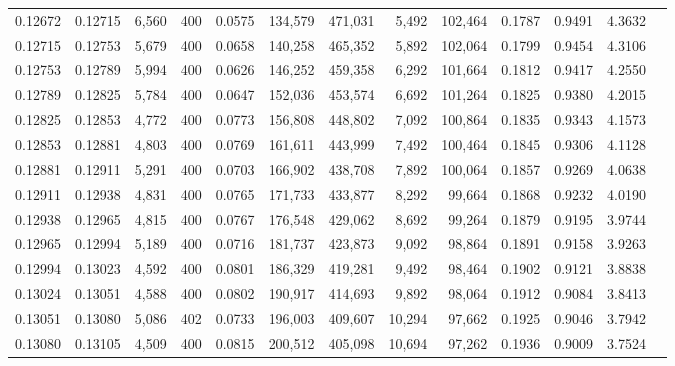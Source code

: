 \begin{tabular}{rrrrrrrrrrrrr}
0.12672 & 0.12715 &  6,560 &   400 &                                     0.0575 & 134,579 & 471,031 &   5,492 & 102,464 & 0.1787 & 0.9491 & 4.3632 \\
0.12715 & 0.12753 &  5,679 &   400 &                                     0.0658 & 140,258 & 465,352 &   5,892 & 102,064 & 0.1799 & 0.9454 & 4.3106 \\
0.12753 & 0.12789 &  5,994 &   400 &                                     0.0626 & 146,252 & 459,358 &   6,292 & 101,664 & 0.1812 & 0.9417 & 4.2550 \\
0.12789 & 0.12825 &  5,784 &   400 &                                     0.0647 & 152,036 & 453,574 &   6,692 & 101,264 & 0.1825 & 0.9380 & 4.2015 \\
0.12825 & 0.12853 &  4,772 &   400 &                                     0.0773 & 156,808 & 448,802 &   7,092 & 100,864 & 0.1835 & 0.9343 & 4.1573 \\
0.12853 & 0.12881 &  4,803 &   400 &                                     0.0769 & 161,611 & 443,999 &   7,492 & 100,464 & 0.1845 & 0.9306 & 4.1128 \\
0.12881 & 0.12911 &  5,291 &   400 &                                     0.0703 & 166,902 & 438,708 &   7,892 & 100,064 & 0.1857 & 0.9269 & 4.0638 \\
0.12911 & 0.12938 &  4,831 &   400 &                                     0.0765 & 171,733 & 433,877 &   8,292 &  99,664 & 0.1868 & 0.9232 & 4.0190 \\
0.12938 & 0.12965 &  4,815 &   400 &                                     0.0767 & 176,548 & 429,062 &   8,692 &  99,264 & 0.1879 & 0.9195 & 3.9744 \\
0.12965 & 0.12994 &  5,189 &   400 &                                     0.0716 & 181,737 & 423,873 &   9,092 &  98,864 & 0.1891 & 0.9158 & 3.9263 \\
0.12994 & 0.13023 &  4,592 &   400 &                                     0.0801 & 186,329 & 419,281 &   9,492 &  98,464 & 0.1902 & 0.9121 & 3.8838 \\
0.13024 & 0.13051 &  4,588 &   400 &                                     0.0802 & 190,917 & 414,693 &   9,892 &  98,064 & 0.1912 & 0.9084 & 3.8413 \\
0.13051 & 0.13080 &  5,086 &   402 &                                     0.0733 & 196,003 & 409,607 &  10,294 &  97,662 & 0.1925 & 0.9046 & 3.7942 \\
0.13080 & 0.13105 &  4,509 &   400 &                                     0.0815 & 200,512 & 405,098 &  10,694 &  97,262 & 0.1936 & 0.9009 & 3.7524 \\

\end{tabular}
